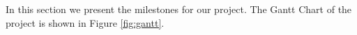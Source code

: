 In this section we present the milestones for our project. The Gantt Chart of the project is shown in Figure \ref{fig:gantt}.


